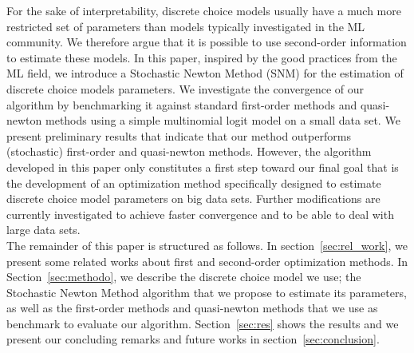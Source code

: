 \documentclass[conference]{IEEEtran}
\begin{document}
For the sake of interpretability, discrete choice models usually have a much more restricted set of parameters than models typically investigated in the ML community. We therefore argue that it is possible to use second-order information to estimate these models. In this paper, inspired by the good practices from the ML field, we introduce a Stochastic Newton Method (SNM) for the estimation of discrete choice models parameters. We investigate the convergence of our algorithm by benchmarking it against standard first-order methods and quasi-newton methods using a simple multinomial logit model on a small data set. We present preliminary results that indicate that our method outperforms (stochastic) first-order and quasi-newton methods. However, the algorithm developed in this paper only constitutes a first step toward our final goal that is the development of an optimization method specifically designed to estimate discrete choice model parameters on big data sets. Further modifications are currently investigated to achieve faster convergence and to be able to deal with large data sets. \\

The remainder of this paper is structured as follows. In section~\ref{sec:rel_work}, we present some related works about first and second-order optimization methods. In Section~\ref{sec:methodo}, we describe the discrete choice model we use; the Stochastic Newton Method algorithm that we propose to estimate its parameters, as well as the first-order methods and quasi-newton methods that we use as benchmark to evaluate our algorithm. Section~\ref{sec:res} shows the results and we present our concluding remarks and future works in section~\ref{sec:conclusion}. 


\end{document}
